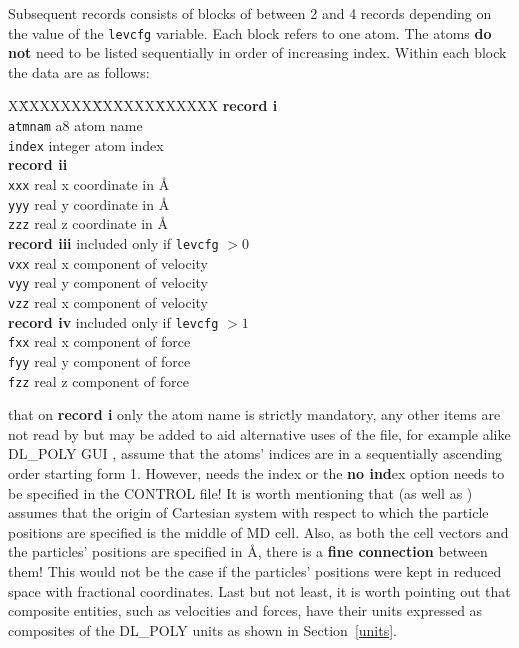 Subsequent records consists of blocks of between 2 and 4 records
depending on the value of the {\tt levcfg} variable.  Each block
refers to one atom.  The atoms {\bf do not} need to be listed
sequentially in order of increasing index.  Within each block the
data are as follows:
\begin{tabbing}
X\=XXXXXXX\=XXXXXX\=XXXXXX\kill
{\bf record i} \\
\> {\tt atmnam}  \> a8      \> atom name \\
\> {\tt index}   \> integer \> atom index \\
{\bf record ii} \\
\> {\tt xxx}     \> real    \> x coordinate in \AA \\
\> {\tt yyy}     \> real    \> y coordinate in \AA \\
\> {\tt zzz}     \> real    \> z coordinate in \AA \\
{\bf record iii} \>         \> included only if {\tt levcfg} $>0$ \\
\> {\tt vxx}     \> real    \> x component of velocity \\
\> {\tt vyy}     \> real    \> y component of velocity \\
\> {\tt vzz}     \> real    \> x component of velocity \\
{\bf record iv}  \>         \> included only if {\tt levcfg} $>1$ \\
\> {\tt fxx}     \> real    \> x component of force \\
\> {\tt fyy}     \> real    \> y component of force \\
\> {\tt fzz}     \> real    \> z component of force
\end{tabbing}
 that on {\bf record i} only the atom name is
strictly mandatory, any other items are not read by \C but may be
added to aid alternative uses of the file, for example alike DL\_POLY
GUI \cite{smith-gui}, \C assume that the atoms' indices
are in a sequentially ascending order starting form 1.  However, \D
needs the index or the {\bf no ind}ex option needs to be specified in
the CONTROL file!  It is worth mentioning that \D (as well as \C)
assumes that the origin of Cartesian system with respect to which
the particle positions are specified is the middle of MD cell.  Also,
as both the cell vectors and the particles' positions are specified
in \AA, there is a {\bf fine connection} between them!  This would
not be the case if the particles' positions were kept in reduced space
with fractional coordinates.  Last but not least, it is worth pointing
out that composite entities, such as velocities and forces, have their
units expressed as composites of the DL\_POLY units as shown in Section~\ref{units}.

